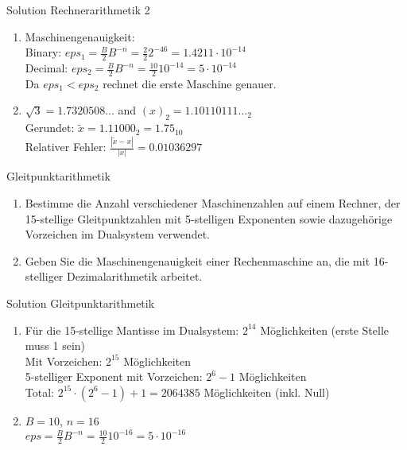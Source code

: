 \begin{KR}{Solution Rechnerarithmetik 2} 
\begin{enumerate}
    \item Maschinengenauigkeit:\\
    Binary: $eps_1 = \frac{B}{2}B^{-n} = \frac{2}{2}2^{-46} = 1.4211 \cdot 10^{-14}$\\
    Decimal: $eps_2 = \frac{B}{2}B^{-n} = \frac{10}{2}10^{-14} = 5 \cdot 10^{-14}$\\
    Da $eps_1 < eps_2$ rechnet die erste Maschine genauer.

    \item $\sqrt{3} = 1.7320508...$ and
    $(x)_2 = 1.10110111..._2$\\
    Gerundet: $\tilde{x} = 1.11000_2 = 1.75_{10}$\\
    Relativer Fehler: $\frac{|\tilde{x}-x|}{|x|} = 0.01036297$
\end{enumerate}
\end{KR}

\begin{example2}{Gleitpunktarithmetik}
\begin{enumerate}
    \item Bestimme die Anzahl verschiedener Maschinenzahlen auf einem Rechner, der 15-stellige Gleitpunktzahlen mit 5-stelligen Exponenten sowie dazugehörige Vorzeichen im Dualsystem verwendet.
    
    \item Geben Sie die Maschinengenauigkeit einer Rechenmaschine an, die mit 16-stelliger Dezimalarithmetik arbeitet.
\end{enumerate}
\end{example2}

\begin{KR}{Solution Gleitpunktarithmetik}
\begin{enumerate}
    \item Für die 15-stellige Mantisse im Dualsystem: $2^{14}$ Möglichkeiten (erste Stelle muss 1 sein)\\
    Mit Vorzeichen: $2^{15}$ Möglichkeiten\\
    5-stelliger Exponent mit Vorzeichen: $2^6-1$ Möglichkeiten\\
    Total: $2^{15} \cdot (2^6-1) + 1 = 2064385$ Möglichkeiten (inkl. Null)

    \item $B = 10$, $n = 16$\\
    $eps = \frac{B}{2}B^{-n} = \frac{10}{2}10^{-16} = 5 \cdot 10^{-16}$
\end{enumerate}
\end{KR}

